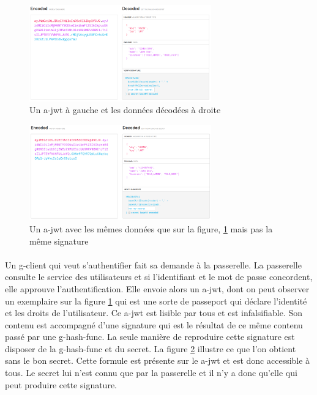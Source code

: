 \begin{figure}[h]
    \centering
    \includegraphics[width=0.7\textwidth]{images/screenshot/jwt-good-secret.png}
    \caption{Un \gls{a-jwt} à gauche et les données décodées à droite}
    \label{fig:jwt-good}
\end{figure}
\begin{figure}[h]
    \centering
    \includegraphics[width=0.7\textwidth]{images/screenshot/jwt-bad-secret.png}
    \caption{Un \gls{a-jwt} avec les mêmes données que sur la figure, \ref{fig:jwt-good} mais pas la même signature}
    \label{fig:jwt-bad}
\end{figure}

\paragraph{}
Un \gls{g-client} qui veut s'authentifier fait sa demande à la passerelle.
La passerelle consulte le service des utilisateurs et si l'identifiant et le mot de passe concordent, elle approuve l'authentification.
Elle envoie alors un \gls{a-jwt}, dont on peut observer un exemplaire sur la figure \ref{fig:jwt-good} qui est une sorte de passeport qui déclare l'identité et les droits de l'utilisateur.
Ce \gls{a-jwt} est lisible par tous et est infalsifiable. Son contenu est accompagné d'une signature qui est le résultat de ce même contenu passé par une \gls{g-hash-func}.
La seule manière de reproduire cette signature est disposer de la \gls{g-hash-func} et du secret.
La figure \ref{fig:jwt-bad} illustre ce que l'on obtient sans le bon secret.
Cette formule est présente sur le \gls{a-jwt} et est donc accessible à tous.
Le secret lui n'est connu que par la passerelle et il n'y a donc qu'elle qui peut produire cette signature.

